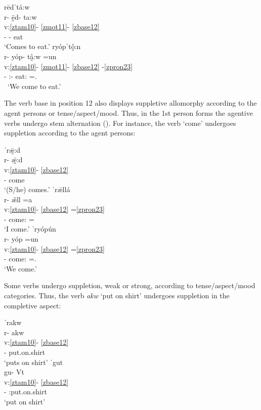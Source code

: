 \documentclass[output=paper]{langscibook}
\begin{document}
\ea\label{bkm:Ref83823047}
{rēdˈtá:w} \\
\glll r- ḛ̄d- ta:w\\
v:\ref{ztam10}- \ref{zmot11}- \ref{zbase12}\\
\Hab{}- \Ven{}- eat\\
\glt `Comes to eat.'
\ex\label{bkm:Ref82098393}
{ryópˈtô̰:n}\\
\glll r- yóp{}- tâ̰:w =un\\
v:\ref{ztam10}- \ref{zmot11}- \ref{zbase12} {}-\ref{zpron23} \\
\Hab{}- \Ven:\First\Pl{}- eat:\First\Pl{} =\First\Pl.\Incl{}\\\
\glt `We come to eat.'
\z

The verb base in position 12 also displays suppletive allomorphy according to the agent persons or tense/aspect/mood. Thus, in the 1st person forms the agentive verbs undergo stem alternation (\citealt{Uchihara2020b}). For instance, the verb `come' undergoes suppletion according to the agent persons:

\ea\label{ex:key:zap:39}
{ˈrǣ̰:d}\\
\glll r- ǣ̰:d\\
v:\ref{ztam10}- \ref{zbase12} \\
\Hab{}- come\\
\glt `(S/he) comes.'
\ex\label{ex:key:zap:40}
{ˈr\={æ}llá} \\
\glll r- \v{æ}ll =a\\
v:\ref{ztam10}- \ref{zbase12} =\ref{zpron23} \\
\Hab{}- come:\First\Sg{} =\First\Sg{} \\
\glt `I come.'
\ex\label{ex:key:zap:41}
{ˈryópún}\\
\glll r- yóp =un\\
v:\ref{ztam10}- \ref{zbase12} =\ref{zpron23} \\ 
\Hab{}- come:\First\Pl{} =\First\Pl.\Incl{}\\
\glt `We come.'
\z

Some verbs undergo suppletion, weak or strong, according to tense{\slash}aspect{\slash}mood categories. Thus, the verb \textit{akw} `put on shirt' undergoes suppletion in the completive aspect:

\ea\label{ex:key:zap:42}
{ˈrakw}\\
\glll r- akw\\
v:\ref{ztam10}- \ref{zbase12} \\
\Hab{}- put.on.shirt\\
\glt `puts on shirt'
\ex\label{ex:key:zap:43}
{ˈgut}\\
\glll gu- Vt\\
v:\ref{ztam10}- \ref{zbase12}\\
\Compl{}- \Compl{}:put.on.shirt\\
\glt `put on shirt'
\z
\end{document}
